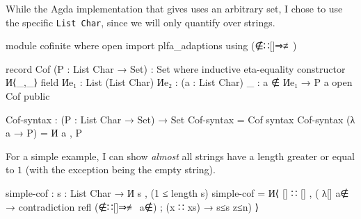 While the Agda implementation that \citet{pitts_locally_2023} gives uses an arbitrary set, I chose
to use the specific \texttt{List Char}, since we will only quantify over strings.
\begin{code}
module cofinite where
  open import plfa_adaptions using (∉∷[]⇒≢)
\end{code}
\begin{comment}
\begin{code}
  -- Data types (naturals, strings, characters)
  open import Data.Nat using (ℕ; zero; suc; _≤_; z≤n; s≤s)
  open import Data.Nat.Properties using (≤-refl; ≤-trans; ≤-antisym; ≤-total)
  open import Data.Char using (Char)
  open import Data.Char.Properties using () renaming (_≟_ to _≟char_)

  -- Relations and predicates/decidability.
  import Relation.Binary.PropositionalEquality as Eq
  open Eq using (_≡_; _≢_; refl; sym; trans; cong)
  open import Relation.Binary.Definitions using (DecidableEquality)
  open import Relation.Nullary.Decidable using (Dec)
  open import Relation.Unary using (Decidable)
  open import Relation.Binary using () renaming (Decidable to BinaryDecidable)
  open import Relation.Nullary.Negation using (contradiction)

  -- Lists.
  open import Data.List using (List; []; _∷_; _++_; length; filter; map; foldr; head; replicate)
  open import Data.List.Properties using (≡-dec)
  import Data.List.Membership.DecPropositional as DecPropMembership
  open import Data.List.Relation.Unary.All using (All; all?; lookup)
    renaming (fromList to All-fromList; toList to All-toList)
  open import Data.List.Relation.Unary.Any using (Any; here; there)
  open import Data.List.Extrema Data.Nat.Properties.≤-totalOrder using (max; xs≤max)

  -- Import list membership using List Char comparisons.
  private
    _≟lchar_ : ∀ (xs ys : List Char) → Dec (xs ≡ ys)
    xs ≟lchar ys = ≡-dec (_≟char_) xs ys

  open DecPropMembership _≟lchar_ using (_∈_; _∉_; _∈?_)
\end{code}
\end{comment}
\begin{code}
  record Cof (P : List Char → Set) : Set where
    inductive
    eta-equality
    constructor И⟨_,_⟩
    field
      Иe₁ : List (List Char)
      Иe₂ : (a : List Char) {_ : a ∉ Иe₁} → P a
  open Cof public
  
  Cof-syntax : (P : List Char → Set) → Set
  Cof-syntax = Cof
  syntax Cof-syntax (λ a → P) = И a , P
\end{code}

For a simple example, I can show \textit{almost} all strings have a length greater or equal to $1$
(with the exception being the empty string).

\begin{code}
  simple-cof : {s : List Char} → И s , (1 ≤ length s)
  simple-cof = И⟨ [] ∷ [] , (
    λ{[] {a∉}  → contradiction refl (∉∷[]⇒≢ a∉)
    ; (x ∷ xs) → s≤s z≤n}) ⟩
\end{code}
